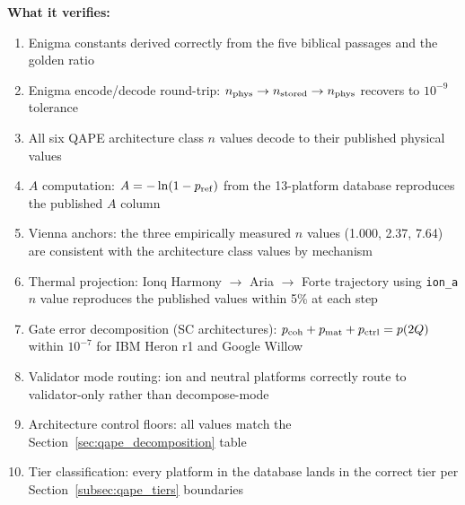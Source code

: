 \documentclass[12pt,a4paper]{article}
\begin{document}
\textbf{What it verifies:}
\begin{enumerate}
\item Enigma constants derived correctly from the five biblical passages
  and the golden ratio
\item Enigma encode/decode round-trip: $n_{\rm phys} \to n_{\rm stored}
  \to n_{\rm phys}$ recovers to $10^{-9}$ tolerance
\item All six QAPE architecture class $n$ values decode to their published
  physical values
\item $A$ computation: $A = -\ln(1 - p_{\rm ref})$ from the 13-platform
  database reproduces the published $A$ column
\item Vienna anchors: the three empirically measured $n$ values (1.000,
  2.37, 7.64) are consistent with the architecture class values by mechanism
\item Thermal projection: Ionq Harmony $\to$ Aria $\to$ Forte trajectory
  using \texttt{ion\_a} $n$ value reproduces the published values within
  5\% at each step
\item Gate error decomposition (SC architectures): $p_{\rm coh} + p_{\rm mat}
  + p_{\rm ctrl} = p(2Q)$ within $10^{-7}$ for IBM Heron r1 and Google
  Willow
\item Validator mode routing: ion and neutral platforms correctly route
  to validator-only rather than decompose-mode
\item Architecture control floors: all values match the
  Section~\ref{sec:qape_decomposition} table
\item Tier classification: every platform in the database lands in the
  correct tier per Section~\ref{subsec:qape_tiers} boundaries
\end{enumerate}
\end{document}
